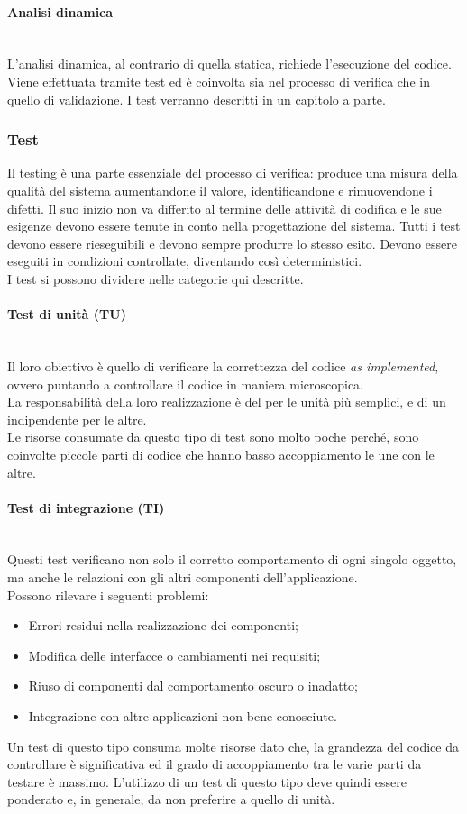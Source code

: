 	\paragraph{Analisi dinamica}
	~\\L'analisi dinamica, al contrario di quella statica, richiede l'esecuzione del codice.
	Viene effettuata tramite test ed è coinvolta sia nel processo di verifica che in quello di validazione.
	I test verranno descritti in un capitolo a parte.
	\subsubsection{Test}
	Il testing è una parte essenziale del processo di verifica: produce una misura della qualità del sistema
	aumentandone il valore, identificandone e rimuovendone i difetti. Il suo inizio non va differito
	al termine delle attività di codifica e le sue esigenze devono essere tenute in conto nella progettazione del sistema. Tutti i test devono essere rieseguibili e devono sempre produrre lo stesso esito. Devono essere eseguiti in condizioni controllate, diventando così deterministici.
	~\\I test si possono dividere nelle categorie qui descritte.
		\paragraph{Test di unità (TU)}
		~\\Il loro obiettivo è quello di verificare la correttezza del codice \emph{as implemented}, ovvero
		puntando a controllare il codice in maniera microscopica.
		\\La responsabilità della loro realizzazione è del \progr{} per le unità più semplici, e di un \ver{} indipendente per le altre.
		\\Le risorse consumate da questo tipo di test sono molto poche perché,  sono coinvolte piccole parti di codice che hanno basso accoppiamento le une con le altre. 
		\paragraph{Test di integrazione (TI)}
		~\\Questi test verificano non solo il corretto comportamento di ogni singolo oggetto, 
		ma anche le relazioni con gli altri componenti dell'applicazione.
		~\\Possono rilevare i seguenti problemi:
		\begin{itemize}
			\item Errori residui nella realizzazione dei componenti;
			\item Modifica delle interfacce o cambiamenti nei requisiti;
			\item Riuso di componenti dal comportamento oscuro o inadatto;
			\item Integrazione con altre applicazioni non bene conosciute.
		\end{itemize}
		Un test di questo tipo consuma molte risorse dato che, la grandezza del codice da controllare è 
		significativa ed il grado di accoppiamento tra le varie parti da testare è massimo. 
		L'utilizzo di un test di questo tipo deve quindi essere ponderato e, in generale, da non preferire a quello di unità.
